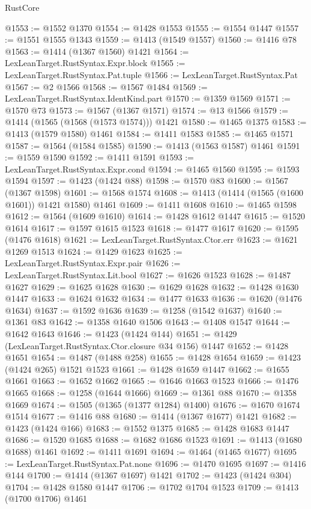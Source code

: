 \begin{lexlean}{RustCore}
\begin{coremodule}
@1553 := @1552 @1370
@1554 := @1428 @1553
@1555 := @1554 @1447
@1557 := @1551 @1555 @1343
@1559 := @1413 (@1549 @1557)
@1560 := @1416 @78
@1563 := @1414 (@1367 @1560) @1421
@1564 := LexLeanTarget.RustSyntax.Expr.block
@1565 := LexLeanTarget.RustSyntax.Pat.tuple
@1566 := LexLeanTarget.RustSyntax.Pat
@1567 := @2 @1566
@1568 := @1567 @1484
@1569 := LexLeanTarget.RustSyntax.IdentKind.part
@1570 := @1359 @1569
@1571 := @1570 @73
@1573 := @1567 (@1367 @1571)
@1574 := @13 @1566
@1579 := @1414 (@1565 (@1568 (@1573 @1574))) @1421
@1580 := @1465 @1375
@1583 := @1413 (@1579 @1580) @1461
@1584 := @1411 @1583
@1585 := @1465 @1571
@1587 := @1564 (@1584 @1585)
@1590 := @1413 (@1563 @1587) @1461
@1591 := @1559 @1590
@1592 := @1411 @1591
@1593 := LexLeanTarget.RustSyntax.Expr.cond
@1594 := @1465 @1560
@1595 := @1593 @1594
@1597 := @1423 (@1424 @88)
@1598 := @1570 @83
@1600 := @1567 (@1367 @1598)
@1601 := @1568 @1574
@1608 := @1413 (@1414 (@1565 (@1600 @1601)) @1421 @1580) @1461
@1609 := @1411 @1608
@1610 := @1465 @1598
@1612 := @1564 (@1609 @1610)
@1614 := @1428 @1612 @1447
@1615 := @1520 @1614
@1617 := @1597 @1615 @1523
@1618 := @1477 @1617
@1620 := @1595 (@1476 @1618)
@1621 := LexLeanTarget.RustSyntax.Ctor.err
@1623 := @1621 @1269 @1513
@1624 := @1429 @1623
@1625 := LexLeanTarget.RustSyntax.Expr.pair
@1626 := LexLeanTarget.RustSyntax.Lit.bool
@1627 := @1626 @1523
@1628 := @1487 @1627
@1629 := @1625 @1628
@1630 := @1629 @1628
@1632 := @1428 @1630 @1447
@1633 := @1624 @1632
@1634 := @1477 @1633
@1636 := @1620 (@1476 @1634)
@1637 := @1592 @1636
@1639 := @1258 (@1542 @1637)
@1640 := @1361 @83
@1642 := @1358 @1640 @1506
@1643 := @1408 @1547
@1644 := @1642 @1643
@1646 := @1423 (@1424 @144)
@1651 := @1429 (LexLeanTarget.RustSyntax.Ctor.closure @34 @156) @1447
@1652 := @1428 @1651
@1654 := @1487 (@1488 @258)
@1655 := @1428 @1654
@1659 := @1423 (@1424 @265) @1521 @1523
@1661 := @1428 @1659 @1447
@1662 := @1655 @1661
@1663 := @1652 @1662
@1665 := @1646 @1663 @1523
@1666 := @1476 @1665
@1668 := @1258 (@1644 @1666)
@1669 := @1361 @88
@1670 := @1358 @1669
@1674 := @1505 (@1365 (@1377 @1284) @1400)
@1676 := @1670 @1674 @1514
@1677 := @1416 @88
@1680 := @1414 (@1367 @1677) @1421
@1682 := @1423 (@1424 @166)
@1683 := @1552 @1375
@1685 := @1428 @1683 @1447
@1686 := @1520 @1685
@1688 := @1682 @1686 @1523
@1691 := @1413 (@1680 @1688) @1461
@1692 := @1411 @1691
@1694 := @1464 (@1465 @1677)
@1695 := LexLeanTarget.RustSyntax.Pat.none
@1696 := @1470 @1695
@1697 := @1416 @144
@1700 := @1414 (@1367 @1697) @1421
@1702 := @1423 (@1424 @304)
@1704 := @1428 @1580 @1447
@1706 := @1702 @1704 @1523
@1709 := @1413 (@1700 @1706) @1461

\end{coremodule}
\end{lexlean}

